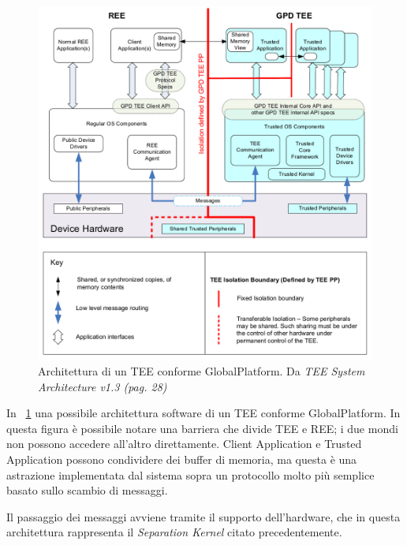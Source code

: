 \documentclass[12pt,italian]{report}
\begin{document}
\begin{figure}
    \centering
    \includegraphics[width=1\textwidth]{immagini/tee-system-architecture}
    \caption{
        Architettura di un TEE conforme GlobalPlatform. 
        Da \textit{TEE System Architecture v1.3 (pag. 28)}
        \cite{gp2020systemarchitecture}
    }
    \label{fig:tee-system-architecture}
\end{figure}

In \figurename~\ref{fig:tee-system-architecture} una possibile architettura
software di un TEE conforme GlobalPlatform. 
In questa figura è possibile notare una barriera che divide TEE e REE; i due
mondi non possono accedere all'altro direttamente.
Client Application e Trusted Application possono condividere dei buffer di
memoria, ma questa è una astrazione implementata dal sistema sopra un
protocollo molto più semplice basato sullo scambio di messaggi.

Il passaggio dei messaggi avviene tramite il supporto dell'hardware, che in
questa architettura rappresenta il \textit{Separation Kernel} citato
precedentemente.
\end{document}
